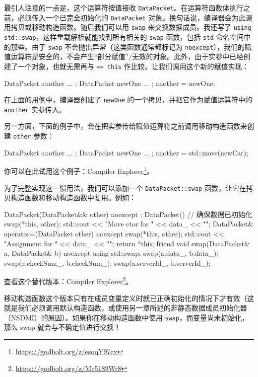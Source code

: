 最引人注意的一点是，这个运算符按值接收 \texttt{DataPacket}。在运算符函数体执行之前，必须传入一个已完全初始化的 \texttt{DataPacket} 对象。换句话说，编译器会为此调用拷贝或移动构造函数。随后我们可以用 \texttt{swap} 来交换数据成员。我还写了 \texttt{using std::swap}，这样重载解析就能找到所有相关的 \texttt{swap} 函数，包括 \texttt{std} 命名空间中的那些。由于 \texttt{swap} 不会抛出异常（这类函数通常都标记为 \texttt{noexcept}），我们的赋值运算符是安全的，不会产生“部分赋值”/无效的对象。此外，由于实参中已经创建了一个对象，也就无需再与 \texttt{== this} 作比较。让我们调用这个新的赋值实现：

\begin{codebox}[cpp]
DataPacket another { ... };
DataPacket newOne { ... };
another = newOne;
\end{codebox}

在上面的用例中，编译器创建了 \texttt{newOne} 的一个拷贝，并把它作为赋值运算符中的 \texttt{another} 实参传入。

另一方面，下面的例子中，会在把实参传给赋值运算符之前调用移动构造函数来创建 \texttt{other} 参数：

\begin{codebox}[cpp]
DataPacket another { ... };
DataPacket newOne { ... };
another = std::move(newCar);
\end{codebox}

你可以在此试用这个例子：Compiler Explorer\footnote{\url{https://godbolt.org/z/esoqY97cx}}。

为了完整实现这一惯用法，我们可以添加一个 \texttt{DataPacket::swap} 函数，让它在拷贝构造函数和移动构造函数中复用。例如：

\begin{codebox}[cpp]
DataPacket(DataPacket&& other) noexcept
: DataPacket() { // 确保数据已初始化
swap(*this, other);
std::cout << "Move ctor for \"" << data_ << "\"\n";
}
DataPacket& operator=(DataPacket other) noexcept {
swap(*this, other);
std::cout << "Assignment for \"" << data_ << "\"\n";
return *this;
}
friend void swap(DataPacket& a, DataPacket& b) noexcept {
using std::swap;
swap(a.data_, b.data_);
swap(a.checkSum_, b.checkSum_);
swap(a.serverId_, b.serverId_);
}
\end{codebox}

查看这个替代版本：Compiler Explorer\footnote{\url{https://godbolt.org/z/Me5189Wr8}}。

移动构造函数这个版本只有在成员变量定义时就已正确初始化的情况下才有效（这就是我们必须调用默认构造函数，或使用另一章所述的非静态数据成员初始化器（NSDMI）的原因）。如果你在移动构造函数中使用 \texttt{swap}，而变量尚未初始化，那么 swap 就会与不确定值进行交换！

